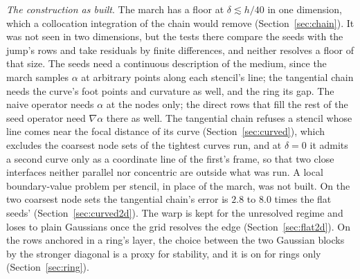 \documentclass[11pt]{amsart}
\theoremstyle{definition}
\theoremstyle{remark}
\newcommand{\para}[1]{\par\smallskip\noindent\textit{#1}.\enspace}
\begin{document}
\para{The construction as built}
The march has a floor at $\delta \lesssim h/40$ in one dimension, which a
collocation integration of the chain would remove
(Section~\ref{sec:chain}). It was not seen in two dimensions, but the tests
there compare the seeds with the jump's rows and take residuals by finite
differences, and neither resolves a floor of that size. The seeds need a
continuous description of the medium, since the march samples $\alpha$ at
arbitrary points along each stencil's line; the tangential chain needs the
curve's foot points and curvature as well, and the ring its gap. The naive
operator needs $\alpha$ at the nodes only; the direct rows that fill the rest
of the seed operator need $\nabla \alpha$ there as well. The tangential chain
refuses a stencil whose line comes near the focal distance of its curve
(Section~\ref{sec:curved}), which excludes the coarsest node sets of the
tightest curves run, and at $\delta = 0$ it admits a second curve only as a
coordinate line of the first's frame, so that two close interfaces neither
parallel nor concentric are outside what was run. A local boundary-value
problem per stencil, in place of the march, was not built. On the two
coarsest node sets the tangential chain's error is $2.8$ to $8.0$ times the
flat seeds' (Section~\ref{sec:curved2d}). The warp
is kept for the unresolved regime and loses to plain Gaussians once the
grid resolves the edge (Section~\ref{sec:flat2d}). On the rows anchored in
a ring's layer, the choice between the two Gaussian blocks by the stronger
diagonal is a proxy for stability, and it is on for rings only
(Section~\ref{sec:ring}).
\end{document}
